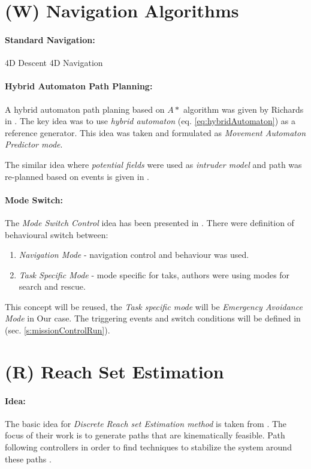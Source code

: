 \section{(W) Navigation Algorithms}\label{s:NavigationAlgorithms}


\paragraph{Standard Navigation:}
4D Descent \cite{lim2018energy}
4D Navigation \cite{gardi2018multi}

\paragraph{Hybrid Automaton Path Planning:} A hybrid automaton path planing based on $A*$ algorithm was given by Richards in \cite{richards2004hybrid}. The key idea was to use \emph{hybrid automaton} (eq. \ref{eq:hybridAutomaton}) as a reference generator. This idea was taken and formulated as \emph{Movement Automaton Predictor mode}. 

The similar idea where \emph{potential fields} were used as \emph{intruder model} and path was re-planned  based on events is given in \cite{dong2011hybrid}.

\paragraph{Mode Switch:} The \emph{Mode Switch Control} idea has been presented in \cite{ryan2005mode}. There were definition of behavioural switch between:
\begin{enumerate}
    \item \emph{Navigation Mode} - navigation control and behaviour was used.
    \item \emph{Task Specific Mode} - mode specific for taks, authors were using modes for search and rescue. 
\end{enumerate}

This concept will be reused, the \emph{Task specific mode} will be \emph{Emergency Avoidance Mode} in Our case. The triggering events and switch conditions will be defined in (sec. \ref{s:missionControlRun}).


\section{(R) Reach Set Estimation}\label{s:ReachSetEstimationTheory}
\paragraph{Idea:} The basic idea for \emph{Discrete Reach set Estimation  method} is taken from \cite{ljungqvist2017lattice}. The focus of their work is to generate paths that are kinematically feasible. Path following controllers in order to find techniques to stabilize the system around these paths \cite{ljungqvist2016path,evestedt2016path}. 

